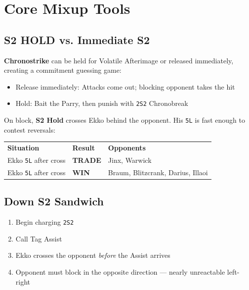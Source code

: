 \documentclass[12pt, a4paper]{report}
\newcommand{\notation}[1]{{\small\texttt{\textcolor{ekkoBlue}{#1}}}}
\newcommand{\movename}[1]{\textbf{\textcolor{ekkoGold}{#1}}}
\begin{document}
\section{Core Mixup Tools}

\subsection{S2 HOLD vs. Immediate S2}

\movename{Chronostrike} can be held for Volatile Afterimage or released immediately, creating a commitment guessing game:

\begin{itemize}
  \item Release immediately: Attacks come out; blocking opponent takes the hit
  \item Hold: Bait the Parry, then punish with \notation{2S2} Chronobreak
\end{itemize}

On block, \movename{S2 Hold} crosses Ekko behind the opponent. His \notation{5L} is fast enough to contest reversals:

\begin{center}
\begin{tabular}{C{3cm} C{3cm} C{7cm}}
\textcolor{ekkoBlue}{\textbf{Situation}} & \textcolor{ekkoBlue}{\textbf{Result}} & \textcolor{ekkoBlue}{\textbf{Opponents}} \\
Ekko \notation{5L} after cross & \textbf{TRADE} & Jinx, Warwick \\
Ekko \notation{5L} after cross & \textbf{WIN} & Braum, Blitzcrank, Darius, Illaoi \\
\end{tabular}
\end{center}

\subsection{Down S2 Sandwich}

\begin{enumerate}
  \item Begin charging \notation{2S2}
  \item Call Tag Assist
  \item Ekko crosses the opponent \textit{before} the Assist arrives
  \item Opponent must block in the opposite direction --- nearly unreactable left-right
\end{enumerate}
\end{document}
